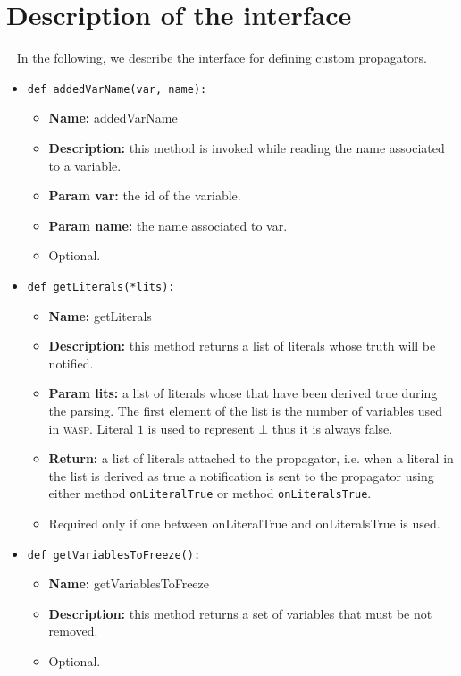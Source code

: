 \documentclass[a4paper,12pt]{article}
\newcommand{\wasp}{\textsc{wasp}\xspace}
\begin{document}
	\section{Description of the interface}~\label{sec:interface}
	In the following, we describe the interface for defining custom propagators.
	\begin{itemize}
		\item \texttt{def addedVarName(var, name):}
		\begin{itemize}
			\item \textbf{Name:} addedVarName
			\item \textbf{Description:} this method is invoked while reading the name associated to a variable.
			\item \textbf{Param var:} the id of the variable.
			\item \textbf{Param name:} the name associated to var.
			\item Optional.
		\end{itemize}

		\item \texttt{def getLiterals(*lits):}
		\begin{itemize}
			\item \textbf{Name:} getLiterals
			\item \textbf{Description:} this method returns a list of literals whose truth will be notified.
			\item \textbf{Param lits:} a list of literals whose that have been derived true during the parsing. The first element of the list is the number of variables used in \wasp. Literal $1$ is used to represent $\bot$ thus it is always false.
			\item \textbf{Return:} a list of literals attached to the propagator, i.e. when a literal in the list is derived as true a notification is sent to the propagator using either method \texttt{onLiteralTrue} or method \texttt{onLiteralsTrue}.
			\item Required only if one between onLiteralTrue and onLiteralsTrue is used.
		\end{itemize}				

		\item \texttt{def getVariablesToFreeze():}
		\begin{itemize}
			\item \textbf{Name:} getVariablesToFreeze
			\item \textbf{Description:} this method returns a set of variables that must be not removed.
			\item Optional.
		\end{itemize}
		

\end{itemize}
\end{document}
